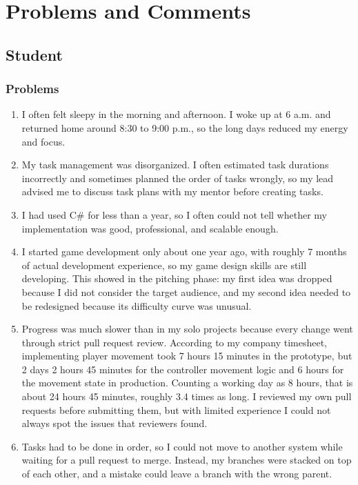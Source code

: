 \chapter{Problems and Comments}

\section{Student}
\subsection{Problems}
\begin{enumerate}[label=\arabic*.]
    \item I often felt sleepy in the morning and afternoon. I woke up at 6 a.m. and returned home around 8:30 to 9:00 p.m., so the long days reduced my energy and focus.
    \item My task management was disorganized. I often estimated task durations incorrectly and sometimes planned the order of tasks wrongly, so my lead advised me to discuss task plans with my mentor before creating tasks.
    \item I had used C\# for less than a year, so I often could not tell whether my implementation was good, professional, and scalable enough.
    \item I started game development only about one year ago, with roughly 7 months of actual development experience, so my game design skills are still developing. This showed in the pitching phase: my first idea was dropped because I did not consider the target audience, and my second idea needed to be redesigned because its difficulty curve was unusual.
    \item Progress was much slower than in my solo projects because every change went through strict pull request review. According to my company timesheet, implementing player movement took 7 hours 15 minutes in the prototype, but 2 days 2 hours 45 minutes for the controller movement logic and 6 hours for the movement state in production. Counting a working day as 8 hours, that is about 24 hours 45 minutes, roughly 3.4 times as long. I reviewed my own pull requests before submitting them, but with limited experience I could not always spot the issues that reviewers found.
    \item Tasks had to be done in order, so I could not move to another system while waiting for a pull request to merge. Instead, my branches were stacked on top of each other, and a mistake could leave a branch with the wrong parent.

\end{enumerate}
